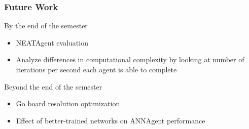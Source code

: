 \documentclass{beamer}
\begin{document}
\begin{frame}
\frametitle{Future Work}
By the end of the semester
\begin{itemize}
 \item NEATAgent evaluation
 \item Analyze differences in computational complexity by looking at number of iterations per second each agent is able to complete
\end{itemize}

 Beyond the end of the semester
\begin{itemize}
 \item Go board resolution optimization
 \item Effect of better-trained networks on ANNAgent performance
\end{itemize}
\end{frame}
\end{document}
